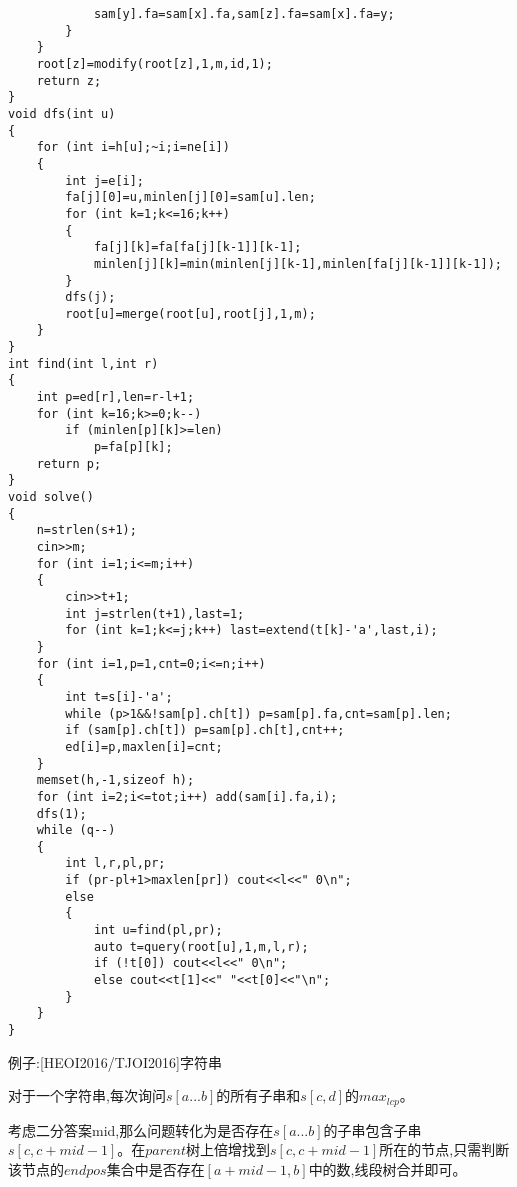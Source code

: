 \documentclass[a4paper]{ctexart}
\begin{document}
\begin{lstlisting}
			sam[y].fa=sam[x].fa,sam[z].fa=sam[x].fa=y;
		}
	}
	root[z]=modify(root[z],1,m,id,1);
	return z;
}
void dfs(int u)
{
	for (int i=h[u];~i;i=ne[i])
	{
		int j=e[i];
		fa[j][0]=u,minlen[j][0]=sam[u].len;
		for (int k=1;k<=16;k++)
		{
			fa[j][k]=fa[fa[j][k-1]][k-1];
			minlen[j][k]=min(minlen[j][k-1],minlen[fa[j][k-1]][k-1]);
		}
		dfs(j);
		root[u]=merge(root[u],root[j],1,m);
	}
}
int find(int l,int r)
{
	int p=ed[r],len=r-l+1;
	for (int k=16;k>=0;k--)
		if (minlen[p][k]>=len)
			p=fa[p][k];
	return p;
}
void solve()
{
	n=strlen(s+1);
	cin>>m;
	for (int i=1;i<=m;i++)
	{
		cin>>t+1;
		int j=strlen(t+1),last=1;
		for (int k=1;k<=j;k++) last=extend(t[k]-'a',last,i);
	}
	for (int i=1,p=1,cnt=0;i<=n;i++)
	{
		int t=s[i]-'a';
		while (p>1&&!sam[p].ch[t]) p=sam[p].fa,cnt=sam[p].len;
		if (sam[p].ch[t]) p=sam[p].ch[t],cnt++;
		ed[i]=p,maxlen[i]=cnt;
	}
	memset(h,-1,sizeof h);
	for (int i=2;i<=tot;i++) add(sam[i].fa,i);
	dfs(1);
	while (q--)
	{
		int l,r,pl,pr;
		if (pr-pl+1>maxlen[pr]) cout<<l<<" 0\n";
		else
		{
			int u=find(pl,pr);
			auto t=query(root[u],1,m,l,r);
			if (!t[0]) cout<<l<<" 0\n";
			else cout<<t[1]<<" "<<t[0]<<"\n";
		}
	}
}
\end{lstlisting}

例子:[HEOI2016/TJOI2016]字符串

对于一个字符串,每次询问$s[a...b]$的所有子串和$s[c,d]$的$max_{lcp}$。

考虑二分答案mid,那么问题转化为是否存在$s[a...b]$的子串包含子串$s[c,c+mid-1]$。在$parent$树上倍增找到$s[c,c+mid-1]$所在的节点,只需判断该节点的$endpos$集合中是否存在$[a+mid-1,b]$中的数,线段树合并即可。
\end{document}
